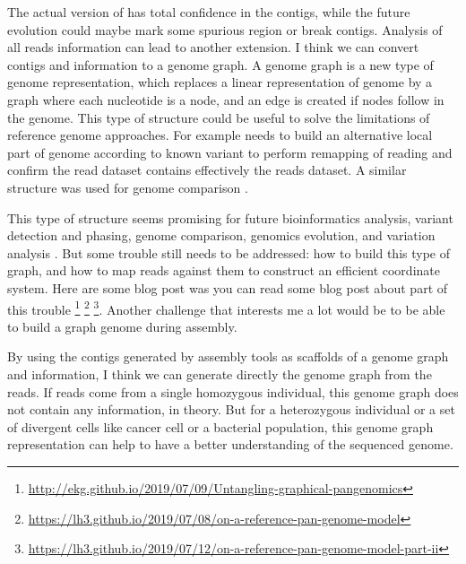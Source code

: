 \documentclass[main.tex]{subfiles}
\begin{document}
The actual version of \knot has total confidence in the contigs, while the future evolution could maybe mark some spurious region or break contigs. Analysis of all reads information can lead to another extension. I think we can convert contigs and \knot \OLC information to a genome graph. A genome graph is a new type of genome representation, which replaces a linear representation of genome by a graph where each nucleotide is a node, and an edge is created if nodes follow in the genome. This type of structure could be useful to solve the limitations of reference genome approaches. 
For example  \cite{whatshap} needs to build an alternative local part of genome according to known variant to perform remapping of reading and confirm the read dataset contains effectively the reads dataset. A similar structure was used for genome comparison  \cite{cactus_graph}.

This type of structure seems promising for future bioinformatics analysis, variant detection and phasing, genome comparison,  genomics evolution, and variation analysis \cite{goodbye_ref_hello_graphs}. But some trouble still needs to be addressed: how to build this type of graph, and how to map reads against them to construct an efficient coordinate system.
Here are some blog post was you can read some blog post about part of this trouble \footnote{\url{http://ekg.github.io/2019/07/09/Untangling-graphical-pangenomics}} \footnote{\url{https://lh3.github.io/2019/07/08/on-a-reference-pan-genome-model}} \footnote{\url{https://lh3.github.io/2019/07/12/on-a-reference-pan-genome-model-part-ii}}. Another challenge that interests me a lot would be to be able to build a graph genome during assembly.

By using the contigs generated by assembly tools as scaffolds of a genome graph and \knot \OLC information, I think we can generate directly the genome graph from the reads. If reads come from a single homozygous individual, this genome graph does not contain any information, in theory. But for a heterozygous individual or a set of divergent cells like cancer cell or a bacterial population, this genome graph representation can help to have a better understanding of the sequenced genome.

\end{document}
